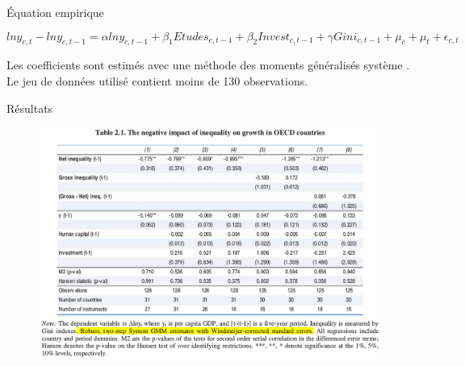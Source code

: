 \documentclass[xcolor=x11names,french]{beamer}
\renewcommand{\(}{\begin{columns}}
\renewcommand{\)}{\end{columns}}
\newcommand{\<}[1]{\begin{column}{#1}}
\renewcommand{\>}{\end{column}}
\begin{document}
\begin{frame}{\'Equation empirique}

\begin{dmath}
ln y_{c, t} - ln y_{c, t - 1} = \alpha ln y_{c, t - 1} + \beta_1 Etudes_{c, t - 1} + \beta_2 Invest_{c, t - 1} + \gamma Gini_{c, t - 1} + \mu_{c} + \mu_{t} + \epsilon_{c, t}
\end{dmath}

Les coefficients sont estimés avec une méthode des moments généralisés \og système \fg{}. \\
Le jeu de données utilisé contient moins de 130 observations.

\end{frame}


\begin{frame}{Résultats}

\begin{figure}
\includegraphics[scale=0.25]{OECD_regression_results}
\end{figure}

\end{frame}
\end{document}
